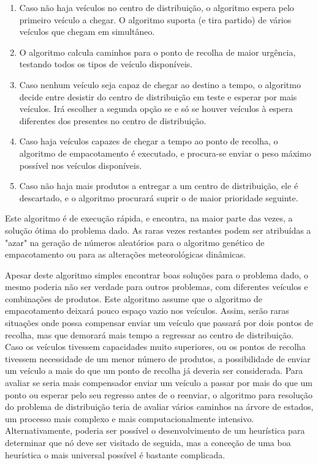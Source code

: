 \documentclass[12pt, a4paper, titlepage]{article}
\begin{document}
\begin{enumerate}
    \item Caso não haja veículos no centro de distribuição, o algoritmo espera pelo primeiro veículo
        a chegar. O algoritmo suporta (e tira partido) de vários veículos que chegam em simultâneo.

    \item O algoritmo calcula caminhos para o ponto de recolha de maior urgência, testando todos os
        tipos de veículo disponíveis.

    \item Caso nenhum veículo seja capaz de chegar ao destino a tempo, o algoritmo decide entre
        desistir do centro de distribuição em teste e esperar por mais veículos. Irá escolher a
        segunda opção se e só se houver veículos à espera diferentes dos presentes no centro de
        distribuição.

    \item Caso haja veículos capazes de chegar a tempo ao ponto de recolha, o algoritmo de
        empacotamento é executado, e procura-se enviar o peso máximo possível nos veículos
        disponíveis.

    \item Caso não haja mais produtos a entregar a um centro de distribuição, ele é descartado, e o
        algoritmo procurará suprir o de maior prioridade seguinte.
\end{enumerate}

Este algoritmo é de execução rápida, e encontra, na maior parte das vezes, a solução ótima do
problema dado. As raras vezes restantes podem ser atribuídas a "azar"{} na geração de números
aleatórios para o algoritmo genético de empacotamento ou para as alterações meteorológicas
dinâmicas.

Apesar deste algoritmo simples encontrar boas soluções para o problema dado, o mesmo poderia não ser
verdade para outros problemas, com diferentes veículos e combinações de produtos. Este algoritmo
assume que o algoritmo de empacotamento deixará pouco espaço vazio nos veículos. Assim, serão raras
situações onde possa compensar enviar um veículo que passará por dois pontos de recolha, mas que
demorará mais tempo a regressar ao centro de distribuição. Caso os veículos tivessem capacidades
muito superiores, ou os pontos de recolha tivessem necessidade de um menor número de produtos, a
possibilidade de enviar um veículo a mais do que um ponto de recolha já deveria ser considerada.
Para avaliar se seria mais compensador enviar um veículo a passar por mais do que um ponto ou
esperar pelo seu regresso antes de o reenviar, o algoritmo para resolução do problema de
distribuição teria de avaliar vários caminhos na árvore de estados, um processo mais complexo e mais
computacionalmente intensivo. Alternativamente, poderia ser possível o desenvolvimento de um
heurística para determinar que nó deve ser visitado de seguida, mas a conceção de uma boa heurística
o mais universal possível é bastante complicada.
\end{document}

